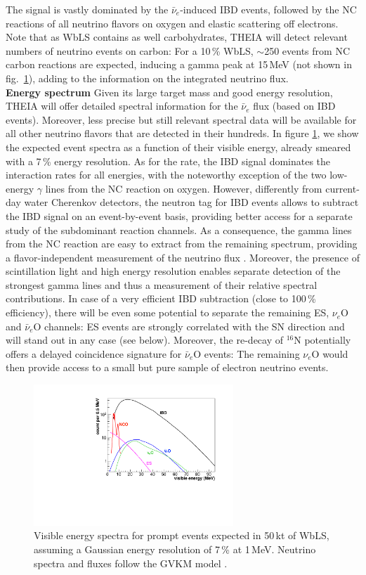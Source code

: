  The signal is vastly dominated by the $\bar\nu_e$-induced IBD events, followed by the NC reactions of all neutrino flavors on oxygen and elastic scattering off electrons. Note that as WbLS contains as well carbohydrates, THEIA will detect relevant numbers of neutrino events on carbon: For a 10\,\% WbLS, $\sim$250 events from NC carbon reactions are expected, inducing a gamma peak at 15\,MeV (not shown in fig.~\ref{fig:snspectra}), adding to the information on the integrated neutrino flux.
\medskip\\
{\bf Energy spectrum} Given its large target mass and good energy resolution, THEIA will offer detailed spectral information for the $\bar\nu_e$ flux (based on IBD events). Moreover, less precise but still relevant spectral data will be available for all other neutrino flavors that are detected in their hundreds. In figure \ref{fig:snspectra}, we show the expected event spectra as a function of their visible energy, already smeared with a 7\,\% energy resolution. As for the rate, the IBD signal dominates the interaction rates for all energies, with the noteworthy exception of the two low-energy $\gamma$ lines from the NC reaction on oxygen. However, differently from current-day water Cherenkov detectors, the neutron tag for IBD events allows to subtract the IBD signal on an event-by-event basis, providing better access for a separate study of the subdominant reaction channels. As a consequence, the gamma lines from the NC reaction are easy to extract from the remaining spectrum, providing a flavor-independent measurement of the neutrino flux \cite{Langanke:1995he,Haxton:1987kc}. Moreover, the presence of scintillation light and high energy resolution enables separate detection of the strongest gamma lines and thus a measurement of their relative spectral contributions. In case of a very efficient IBD subtraction (close to 100\,\% efficiency), there will be even some potential to separate the remaining ES, $\nu_e$O and $\bar\nu_e$O channels: ES events are strongly correlated with the SN direction and will stand out in any case (see below). Moreover, the re-decay of $^{16}$N potentially offers a delayed coincidence signature for $\bar\nu_e$O events: The remaining $\nu_e$O would then provide access to a small but pure sample of electron neutrino events. 
\begin{figure}[h!]
\centering
\includegraphics[width=0.67\textwidth]{sn_spectra.pdf}
\caption{Visible energy spectra for prompt events expected in 50\,kt of WbLS, assuming a Gaussian energy resolution of 7\,\% at 1\,MeV. Neutrino spectra and fluxes follow the GVKM model \cite{Gava:2009pj}.}
\label{fig:snspectra}
\end{figure}
